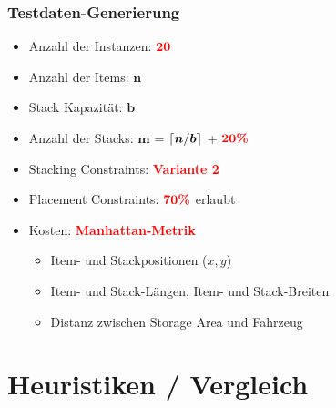 \documentclass{beamer}
\DeclarePairedDelimiter{\ceil}{\lceil}{\rceil}
\begin{document}
\begin{frame}
\frametitle{Testdaten-Generierung}

\begin{itemize}
  \item Anzahl der Instanzen: \textcolor{red}{$\boldsymbol{20}$}\newline
  \item Anzahl der Items: $\boldsymbol{n}$
  \item Stack Kapazität: $\boldsymbol{b}$
  \item Anzahl der Stacks: $\boldsymbol{m}$ = $\ceil{\boldsymbol{n} / \boldsymbol{b}}$ + $\textcolor{red}{\boldsymbol{20 \%}}$\newline
  \item Stacking Constraints: \textcolor{red}{\textbf{Variante 2}}
  \item Placement Constraints: $\textcolor{red}{\boldsymbol{70 \%}}$ erlaubt
  \item Kosten: \textcolor{red}{\textbf{Manhattan-Metrik}}
  \begin{itemize}
    \item Item- und Stackpositionen ($x, y$)
    \item Item- und Stack-Längen, Item- und Stack-Breiten
    \item Distanz zwischen Storage Area und Fahrzeug
  \end{itemize}
\end{itemize}
\end{frame}

\section{Heuristiken / Vergleich}
\end{document}
